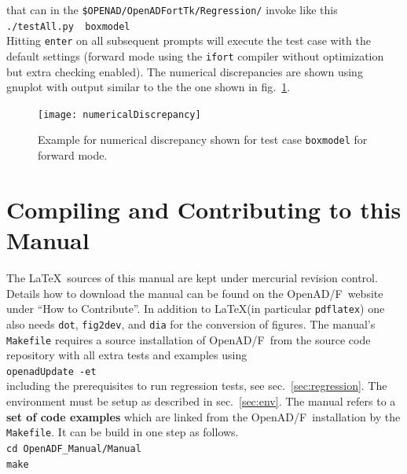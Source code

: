 \documentclass{book}
\newcommand{\OpenADF}{OpenAD/F}
\newcommand{\refsec}[1]{{sec.~\ref{#1}}}
\newcommand{\reffig}[1]{{fig.~\ref{#1}}}
\begin{document}
that can in the \lstinline{$OPENAD/OpenADFortTk/Regression/}%
invoke like this\\[1ex]
\hspace*{.3cm}\lstinline{./testAll.py  boxmodel}\\[1ex]
Hitting \lstinline{enter} on all subsequent prompts will execute the test case
with the default settings (forward mode using the \lstinline{ifort} compiler without 
optimization but extra checking enabled). 
The numerical discrepancies are shown using gnuplot with output similar to the 
the one shown in \reffig{fig:numericalDiscrepancy}.
\begin{figure}
  \centering\texttt{[image: numericalDiscrepancy]}
  \caption{Example for numerical discrepancy shown for test case \lstinline{boxmodel} 
for forward mode.} \label{fig:numericalDiscrepancy}
\end{figure} 

 
\section{Compiling and Contributing to this Manual}\label{sec:compilingManual}
The \LaTeX\ sources of this manual are kept under 
mercurial revision control. Details how to download 
the manual can be found on the \OpenADF\ website under ``How to Contribute''.  
In addition to \LaTeX  (in particular \lstinline{pdflatex}) 
one also needs \lstinline{dot}, \lstinline{fig2dev}, and 
\lstinline{dia} for the conversion of figures. 
The manual's \lstinline{Makefile} requires a source installation of \OpenADF\
from the source code repository with all extra tests and examples using \\[1ex]
\hspace*{.3cm}\lstinline{openadUpdate -et}\\[1ex]
including the prerequisites to run regression tests, see \refsec{sec:regression}.
The environment must be setup as described in \refsec{sec:env}.
The manual refers to a {\bf set of code examples} which are 
linked from the \OpenADF\ installation by the \lstinline{Makefile}.
It can be build in one step as follows.\\[1ex]
\hspace*{.3cm}\lstinline{cd OpenADF_Manual/Manual}\\
\hspace*{.3cm}\lstinline{make}\\[1ex]
   
\end{document}
